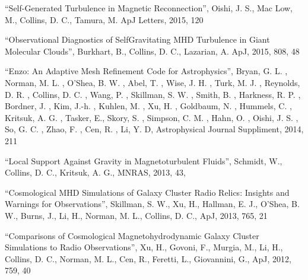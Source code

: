 \medskip
\noindent
``Self-Generated Turbulence in Magnetic Reconnection'', 
Oishi, J. S., Mac Low, M., Collins, D. C., Tamura, M.  
ApJ Letters, 2015, 120

\medskip
\noindent
``Observational Diagnostics of Self­Gravitating MHD Turbulence in Giant Molecular Clouds'', 
Burkhart, B., Collins, D.  C., Lazarian, A.
ApJ,  2015, 808, 48

\medskip
\noindent
``Enzo: An Adaptive Mesh Refinement Code for Astrophysics'', 
Bryan, G. L. , Norman, M. L. , O'Shea, B. W. , Abel, T. , Wise, J. H. , Turk, M. J. , Reynolds, D. R. , Collins, D. C. , Wang, P. , Skillman, S. W. , Smith, B. , Harkness, R. P. , Bordner, J. , Kim, J.-h. , Kuhlen, M. , Xu, H. , Goldbaum, N. , Hummels, C. , Kritsuk, A. G. , Tasker, E., Skory, S. , Simpson, C. M. , Hahn, O. , Oishi, J. S. , So, G. C. , Zhao, F. , Cen, R. , Li, Y. D,
Astrophysical Journal Suppliment, 2014, 211

\medskip
\noindent
``Local Support Against Gravity in Magnetoturbulent Fluids'',
Schmidt, W., Collins, D. C., Kritsuk, A. G.,
MNRAS, 2013, 43, 


\medskip
\noindent
``Cosmological MHD Simulations of Galaxy Cluster Radio Relics: Insights and Warnings for Observations'', 
Skillman, S. W., Xu, H., Hallman, E. J., O’Shea, B. W., Burns, J., Li, H., Norman, M. L., Collins, D. C.,
ApJ, 2013, 765, 21

\medskip
\noindent
``Comparisons of Cosmological Magnetohydrodynamic Galaxy Cluster Simulations to Radio Observations'', 
Xu, H., Govoni, F., Murgia, M., Li, H., Collins, D. C., Norman, M. L., Cen, R., Feretti, L., Giovannini, G.,
ApJ, 2012, 759, 40

